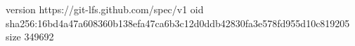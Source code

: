 version https://git-lfs.github.com/spec/v1
oid sha256:16bd4a47a608360b138efa47ca6b3c12d0ddb42830fa3e578fd955d10c819205
size 349692

